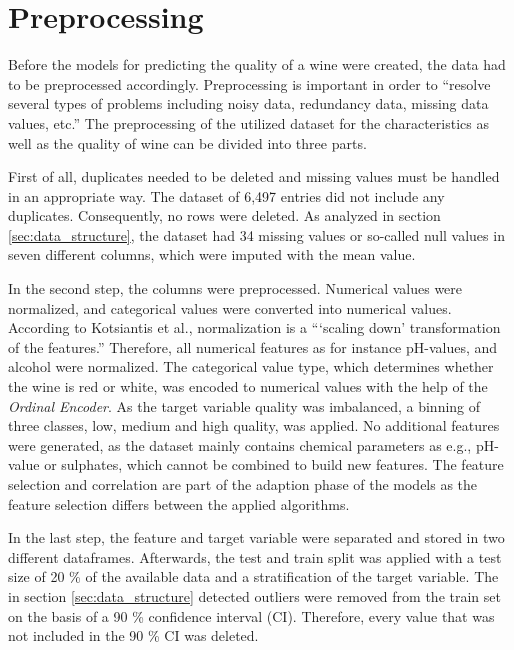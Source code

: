 \section{Preprocessing}\label{chap:preprocessing}
Before the models for predicting the quality of a wine were created, the data had to be preprocessed accordingly. Preprocessing is important in order to \enquote{resolve several types of problems including noisy data, redundancy data, missing data values, etc.} \citep[p. 116]{Kotsiantis2006} The preprocessing of the utilized dataset for the characteristics as well as the quality of wine can be divided into three parts.

First of all, duplicates needed to be deleted and missing values must be handled in an appropriate way. The dataset of 6,497 entries did not include any duplicates. Consequently, no rows were deleted. As analyzed in section \ref{sec:data_structure}, the dataset had 34 missing values or so-called null values in seven different columns, which were imputed with the mean value.

In the second step, the columns were preprocessed. Numerical values were normalized, and categorical values were converted into numerical values. According to Kotsiantis et al., normalization is a \enquote{\enquote{scaling down} transformation of the features.} \citep[p. 113]{Kotsiantis2006} Therefore, all numerical features as for instance pH-values, and alcohol were normalized. The categorical value type, which determines whether the wine is red or white, was encoded to numerical values with the help of the \textit{Ordinal Encoder}. \citep{OrdinalEncoder2021} As the target variable quality was imbalanced, a binning of three classes, low, medium and high quality, was applied. No additional features were generated, as the dataset mainly contains chemical parameters as e.g., pH-value or sulphates, which cannot be combined to build new features. The feature selection and correlation are part of the adaption phase of the models as the feature selection differs between the applied algorithms.

In the last step, the feature and target variable were separated and stored in two different dataframes. Afterwards, the test and train split was applied with a test size of 20 \% of the available data and a stratification of the target variable. The in section \ref{sec:data_structure} detected outliers were removed from the train set on the basis of a 90 \% confidence interval (CI). \citep{AskPython2021} Therefore, every value that was not included in the 90 \% CI was deleted.



